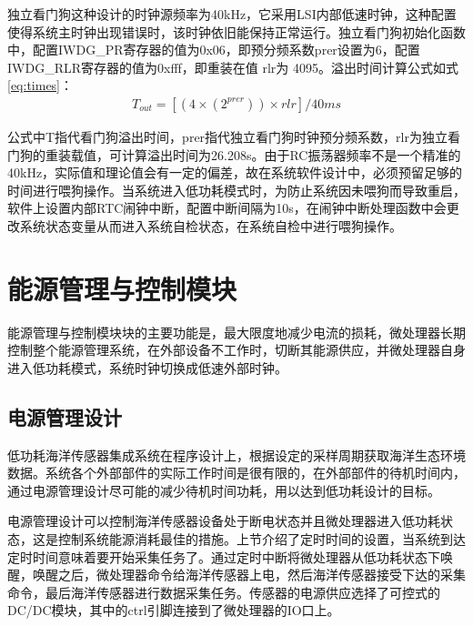 独立看门狗这种设计的时钟源频率为40kHz，它采用LSI内部低速时钟，这种配置使得系统主时钟出现错误时，该时钟依旧能保持正常运行。独立看门狗初始化函数中，配置IWDG\_PR寄存器的值为0x06，即预分频系数prer设置为6，配置IWDG\_RLR寄存器的值为0xfff，即重装在值 rlr为 4095。溢出时间计算公式如式\ref{eq:times}：
\begin{equation}
\begin{split}
T_{out}=[(4\times(2^{prer})) \times rlr] /40 ms
\end{split}
\label{eq:times}
\end{equation}  

公式中T指代看门狗溢出时间，prer指代独立看门狗时钟预分频系数，rlr为独立看门狗的重装载值，可计算溢出时间为26.208s。由于RC振荡器频率不是一个精准的40kHz，实际值和理论值会有一定的偏差，故在系统软件设计中，必须预留足够的时间进行喂狗操作。当系统进入低功耗模式时，为防止系统因未喂狗而导致重启，软件上设置内部RTC闹钟中断，配置中断间隔为10s，在闹钟中断处理函数中会更改系统状态变量从而进入系统自检状态，在系统自检中进行喂狗操作。

\section{能源管理与控制模块}
能源管理与控制模块块的主要功能是，最大限度地减少电流的损耗，微处理器长期控制整个能源管理系统，在外部设备不工作时，切断其能源供应，并微处理器自身进入低功耗模式，系统时钟切换成低速外部时钟。
\subsection{电源管理设计}
低功耗海洋传感器集成系统在程序设计上，根据设定的采样周期获取海洋生态环境数据。系统各个外部部件的实际工作时间是很有限的，在外部部件的待机时间内，通过电源管理设计尽可能的减少待机时间功耗，用以达到低功耗设计的目标。

电源管理设计可以控制海洋传感器设备处于断电状态并且微处理器进入低功耗状态，这是控制系统能源消耗最佳的措施。上节介绍了定时时间的设置，当系统到达定时时间意味着要开始采集任务了。通过定时中断将微处理器从低功耗状态下唤醒，唤醒之后，微处理器命令给海洋传感器上电，然后海洋传感器接受下达的采集命令，最后海洋传感器进行数据采集任务。传感器的电源供应选择了可控式的DC/DC模块，其中的ctrl引脚连接到了微处理器的IO口上。


